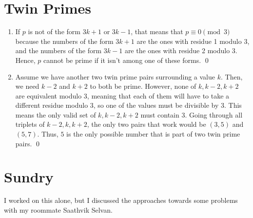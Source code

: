\documentclass{article}
\begin{document}
\section{Twin Primes}
\begin{enumerate}[label=\alph*.]
	\item If $p$ is not of the form $3k+1$ or $3k-1$, that means that $p \equiv 0 \pmod 3$ because 
	the numbers of the form $3k+1$ are the ones with residue 1 modulo 3, and the numbers of the 
	form $3k-1$ are the ones with residue 2 modulo 3. Hence, $p$ cannot be prime if it isn't 
	among one of these forms. \qed
	\item Assume we have another two twin prime pairs surrounding a value $k$. Then, we need $k-2$ and $k+2$
	to both be prime. However, none of $k, k-2, k+2$ are equivalent modulo 3, meaning that each of them 
	will have to take a different residue modulo 3, so one of the values must be divisible by 3.
	This means the only valid set of $k, k-2, k+2$ 
	must contain 3. Going through all triplets of $k-2, k, k+2$, the only two pairs that work would be 
	$(3,5)$ and $(5, 7)$. Thus, $5$ is the only possible number that is part of two twin prime pairs.
	\qed
\end{enumerate}

\section{Sundry}
I worked on this alone, but I discussed the approaches towards some problems with my roommate
Saathvik Selvan.
\end{document}
